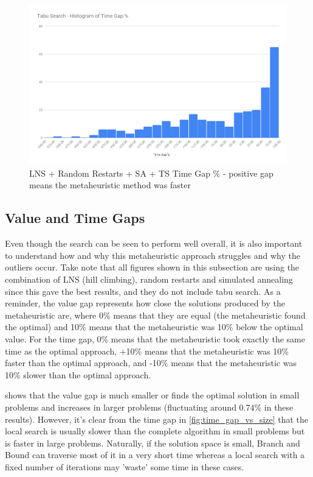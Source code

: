 \begin{figure}[!htbp]
    \centering
    \includegraphics[width=\textwidth]{Figures/Metaheuristics/tabu_time_gap.png}
    \caption{LNS + Random Restarts + SA + TS Time Gap \% - positive gap means the metaheuristic method was faster}
    \label{fig:time_gap_perc_tabu}
\end{figure}

\FloatBarrier

\subsection{Value and Time Gaps}

Even though the search can be seen to perform well overall, it is also important to understand how and why this metaheuristic approach struggles and why the outliers occur. Take note that all figures shown in this subsection are using the combination of LNS (hill climbing), random restarts and simulated annealing since this gave the best results, and they do not include tabu search. As a reminder, the value gap represents how close the solutions produced by the metaheuristic are, where 0\% means that they are equal (the metaheuristic found the optimal) and 10\% means that the metaheuristic was 10\% below the optimal value. For the time gap, 0\% means that the metaheuristic took exactly the same time as the optimal approach, +10\% means that the metaheuristic was 10\% faster than the optimal approach, and -10\% means that the metaheuristic was 10\% slower than the optimal approach.

 shows that the value gap is much smaller or finds the optimal solution in small problems and increases in larger problems (fluctuating around 0.74\% in these results). However, it's clear from the time gap in \cref{fig:time_gap_vs_size} that the local search is usually slower than the complete algorithm in small problems but is faster in large problems. Naturally, if the solution space is small, Branch and Bound can traverse most of it in a very short time whereas a local search with a fixed number of iterations may 'waste' some time in these cases.

